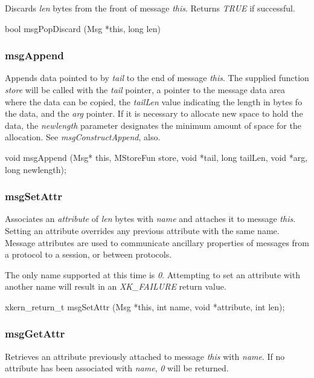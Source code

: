 Discards {\em len} bytes from the front of message {\em this}.
Returns {\em TRUE} if successful.
\medskip

{\sem bool}  {\bold msgPopDiscard} ({\sem Msg} *{\caps this}, {\sem
long} {\caps len})
\medskip

\subsubsection{msgAppend}

Appends data pointed to by {\em tail} to the end of message {\em
this}.  The supplied function {\em store} will be called with the {\em
tail} pointer, a pointer to the message data area where the data
can be copied, the {\em tailLen} value indicating the length in bytes
fo the data, and the {\em arg} pointer.
If it is necessary to allocate new space to hold the data, the
{\em newlength} parameter designates the minimum amount of space 
for the allocation.  See {\em msgConstructAppend}, also.
\medskip

{\sem void} {\bold msgAppend} ({\sem Msg*} {\caps this}, {\sem
MStoreFun} {\caps  store}, {\sem void} *{\caps tail},
{\sem long} {\caps tailLen}, {\sem void} *{\caps arg},
{\sem long} {\caps newlength});
\medskip

\subsubsection{msgSetAttr}

Associates an {\em attribute} of {\em len} bytes with {\em name}
and attaches it to message {\em this}.  Setting an attribute overrides
any previous attribute with the same name.  Message attributes are used
to communicate ancillary properties of messages from a protocol to a session,
or between protocols.

The only name supported at this time is {\em 0}.  Attempting to set an
attribute with another name will result in an {\em XK\_FAILURE} return
value.  

\medskip

{\sem xkern\_return\_t} {\bold msgSetAttr} 
({\sem Msg} *{\caps this}, {\sem int} {\caps name},
{\sem void} *{\caps attribute}, {\sem int} {\caps len});
\medskip

\subsubsection{msgGetAttr}

Retrieves an attribute previously attached to message {\em this} with
{\em name}.  If no attribute has been associated with {\em name}, 
{\em 0} will be returned.
\medskip

